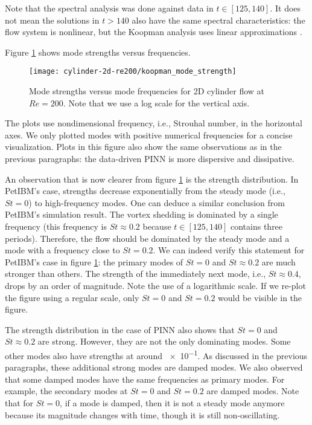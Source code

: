 Note that the spectral analysis was done against data in $t\in[125, 140]$.
It does not mean the solutions in $t>140$ also have the same spectral characteristics: the flow system is nonlinear, but the Koopman analysis uses linear approximations \cite{rowley_spectral_2009}.

Figure \ref{fig:cylinder-re200-koopman-mode-strength} shows mode strengths versus frequencies.
\begin{figure}
    \centering%
    \texttt{[image: cylinder-2d-re200/koopman\_mode\_strength]}%
    \caption{%
        Mode strengths versus mode frequencies for 2D cylinder flow at $Re=\num{200}$.
        Note that we use a log scale for the vertical axis.
    }
    \label{fig:cylinder-re200-koopman-mode-strength}%
\end{figure}
The plots use nondimensional frequency, i.e., Strouhal number, in the horizontal axes. 
We only plotted modes with positive numerical frequencies for a concise visualization.
Plots in this figure also show the same observations as in the previous paragraphs: the data-driven PINN is more dispersive and dissipative.

An observation that is now clearer from figure \ref{fig:cylinder-re200-koopman-mode-strength} is the strength distribution.
In PetIBM's case, strengths decrease exponentially from the steady mode (i.e., $St=0$) to high-frequency modes.
One can deduce a similar conclusion from PetIBM's simulation result.
The vortex shedding is dominated by a single frequency (this frequency is $St\approx 0.2$ because $t\in[125, 140]$ contains three periods).
Therefore, the flow should be dominated by the steady mode and a mode with a frequency close to $St=0.2$.
We can indeed verify this statement for PetIBM's case in figure \ref{fig:cylinder-re200-koopman-mode-strength}: the primary modes of $St=0$ and $St\approx 0.2$ are much stronger than others.
The strength of the immediately next mode, i.e., $St\approx 0.4$, drops by an order of magnitude. 
Note the use of a logarithmic scale.
If we re-plot the figure using a regular scale, only $St=0$ and $St=0.2$ would be visible in the figure.

The strength distribution in the case of PINN also shows that $St=0$ and $St\approx 0.2$ are strong.
However, they are not the only dominating modes.  
Some other modes also have strengths at around \num{e-1}.
As discussed in the previous paragraphs, these additional strong modes are damped modes.
We also observed that some damped modes have the same frequencies as primary modes.
For example, the secondary modes at $St=0$ and $St=0.2$ are damped modes.
Note that for $St=0$, if a mode is damped, then it is not a steady mode anymore because its magnitude changes with time, though it is still non-oscillating.

